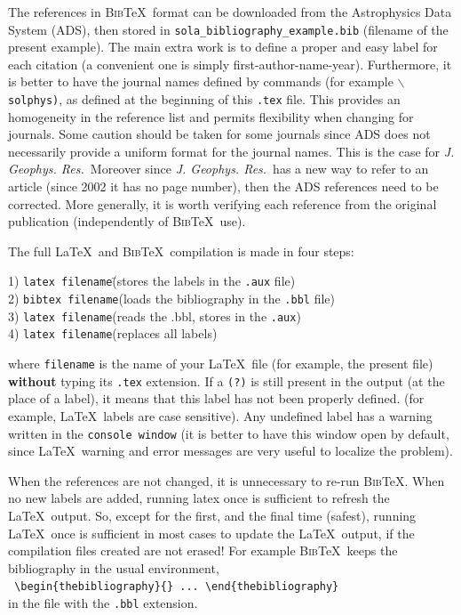 \documentclass[namedreferences]{solarphysics}
\newcommand{\BibTeX}{\textsc{Bib}\TeX}
\newcommand{\jgr}{    {\it J. Geophys. Res.}}
\begin{document}
\begin{article}
  The references in \BibTeX\ format can be downloaded from the 
Astrophysics Data System (ADS), then stored
in \verb+sola_bibliography_example.bib+ (file\linebreak name of the present example).
The main extra work is to define a proper and easy label for each citation
(a convenient one is simply first-author-name-year).  Furthermore, it is better
to have the journal names defined by commands (for example 
\texttt{$\backslash$solphys)}, as defined at the beginning of 
this \texttt{.tex} file.
This provides an homogeneity in the reference list and permits flexibility
when changing for journals.   Some caution should be taken for some journals
since ADS does not necessarily provide a uniform format for the
journal names. This is the case for \jgr\  Moreover since
\jgr\ has a new way to refer to an article 
(since 2002 it has no page number), then the ADS references need to be corrected. 
More generally, it is worth verifying
each reference from the original publication (independently of \BibTeX\ use).

   The full \LaTeX\ and \BibTeX\ compilation is made in four steps: 
\begin{tabbing}
1) {\tt latex filename}\qquad\qquad\=(stores the labels in the {\tt .aux} file)\\
2) {\tt bibtex filename}\>(loads the bibliography in the {\tt .bbl} file)\\
3) {\tt latex filename}\>(reads the .bbl, stores in the {\tt .aux})\\
4) {\tt latex filename}\>(replaces all labels)  
\end{tabbing}
   where \texttt{filename} is the name of your \LaTeX\ file (for example, 
the present file) {\bf without} typing its \texttt{.tex} extension.
If a \texttt{(?)} is still present in the output (at the place of a label),
it means that this label has not been properly defined. 
 (for example, \LaTeX\ labels are case sensitive).
Any undefined label has a warning written in the \texttt{console window}
(it is better to have this window open by default, since \LaTeX\ warning and 
error messages are very useful to localize the problem).

  When the references are not changed, it is unnecessary to re-run \BibTeX .
When no new labels are added, running latex once is sufficient to refresh
the \LaTeX\ output. So, except for
the first, and the final time (safest), running \LaTeX\ once is sufficient
in most cases to update the \LaTeX\ output, if the compilation files 
created are not erased! For example \BibTeX\ keeps the bibliography in the usual 
environment,\\
  \verb+ \begin{thebibliography}{} ... \end{thebibliography}+\\
in the file with the \verb+.bbl+ extension.  


\end{article}
\end{document}
